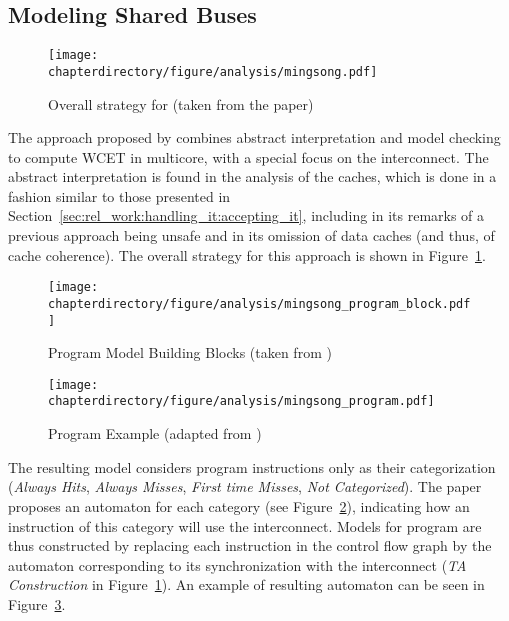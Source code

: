 \stopallthesefloats{}
\subsection{Modeling Shared Buses}
\begin{figure}[hbt!]
\begin{center}
\texttt{[image: \\chapterdirectory/figure/analysis/mingsong.pdf]}
\end{center}
\caption{Overall strategy for \cite{5702243} (taken from the paper)}%
\label{fig:formal_analysis:mingsong}
\end{figure}

The approach proposed by \cite{5702243} combines abstract interpretation and
model checking to compute WCET in multicore, with a special focus on the
interconnect. The abstract interpretation is found in the analysis of the
caches, which is done in a fashion similar to those presented in
Section~\ref{sec:rel_work:handling_it:accepting_it}, including in its remarks
of a previous approach being unsafe and in its omission of data caches (and
thus, of cache coherence). The overall strategy for this approach is shown in
Figure~\ref{fig:formal_analysis:mingsong}.

\begin{figure}[hbt!]
\begin{center}
\texttt{[image: \\chapterdirectory/figure/analysis/mingsong\_program\_block.pdf]}
\end{center}
\caption{Program Model Building Blocks (taken from \cite{5702243})}%
\label{fig:formal_analysis:mingsong_prog_blocks}
\end{figure}

\begin{figure}[hbt!]
\begin{center}
\texttt{[image: \\chapterdirectory/figure/analysis/mingsong\_program.pdf]}
\end{center}
\caption{Program Example (adapted from \cite{5702243})}%
\label{fig:formal_analysis:mingsong_program}
\end{figure}

The resulting model considers program instructions only as their categorization
(\textit{Always Hits}, \textit{Always Misses}, \textit{First time Misses},
\textit{Not Categorized}). The paper proposes an automaton for each category
(see Figure~\ref{fig:formal_analysis:mingsong_prog_blocks}),
indicating how an instruction of this category will use the
interconnect. Models for program are thus constructed by replacing each
instruction in the control flow graph by the automaton corresponding to its
synchronization with the interconnect
(\textit{TA Construction} in Figure~\ref{fig:formal_analysis:mingsong}). An
example of resulting automaton can be seen in
Figure~\ref{fig:formal_analysis:mingsong_program}.

